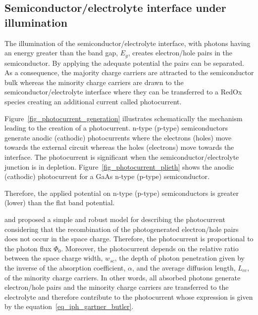 
\clearpage


\subsection{Semiconductor/electrolyte interface under illumination}
The illumination of the semiconductor/electrolyte interface, 
with photons having an energy greater than the band gap, $E_g$, creates 
electron/hole pairs in the semiconductor. 
By applying the adequate potential the pairs can be separated. 
As a consequence, the majority charge carriers are attracted to the 
semiconductor bulk whereas the minority charge carriers are drawn to the 
semiconductor/electrolyte interface where they can be transferred to a RedOx 
species creating an additional current called photocurrent.  

Figure~\ref{fig_photocurrent_generation} illustrates schematically the 
mechanism leading to the creation of a photocurrent. n-type (p-type) 
semiconductors generate anodic (cathodic) photocurrents where the 
electrons (holes) move towards the external circuit whereas the holes (electrons) 
move towards the interface. 
The photocurrent is significant when the semiconductor/electrolyte junction 
is in depletion. 
Figure~\ref{fig_photocurrent_plieth} shows the anodic (cathodic) photocurrent 
for a GaAs n-type (p-type) semiconductor.

Therefore, the applied potential on n-type (p-type) semiconductors is 
greater (lower) than the flat band potential.





\citet{gartner1959-1} and \citet{butler1977-1} proposed a simple and robust model for 
describing the photocurrent considering that the recombination of the 
photogenerated electron/hole pairs does not occur in the space charge. 
Therefore, the photocurrent is proportional to the photon flux $\Phi _0$. 
Moreover, the photocurrent depends on the relative ratio between the space 
charge width, $w_{sc}$, the depth of photon penetration given by the inverse 
of the absorption coefficient, $ \alpha $, and the average diffusion length, 
$L_{cc}$, of the minority charge carriers. 
In other words, all absorbed photons generate electron/hole pairs and 
the minority charge carriers are transferred to the electrolyte and 
therefore contribute to the photocurrent whose expression is given 
by the equation~\ref{eq_iph_gartner_butler}.

